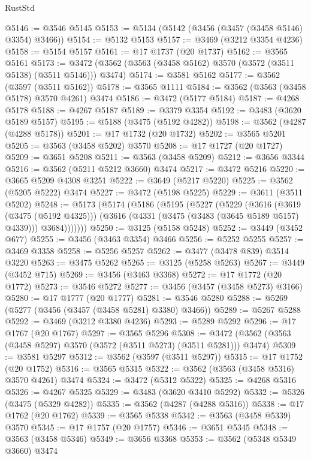 \begin{lexlean}{RustStd}
\begin{coremodule}
@5146 := @3546 @5145
@5153 := @5134 (@5142 (@3456 (@3457 (@3458 @5146) @3354) @3466))
@5154 := @5132 @5153
@5157 := @3469 (@3212 @3354 @4236)
@5158 := @5154 @5157
@5161 := @17 @1737 (@20 @1737)
@5162 := @3565 @5161
@5173 := @3472 (@3562 (@3563 (@3458 @5162) @3570 (@3572 (@3511 @5138) (@3511 @5146))) @3474)
@5174 := @3581 @5162
@5177 := @3562 (@3597 (@3511 @5162))
@5178 := @3565 @1111
@5184 := @3562 (@3563 (@3458 @5178) @3570 @4261) @3474
@5186 := @3472 (@5177 @5184)
@5187 := @4268 @5178
@5188 := @4267 @5187
@5189 := @3379 @3354
@5192 := @3483 (@3620 @5189 @5157)
@5195 := @5188 (@3475 (@5192 @4282))
@5198 := @3562 (@4287 (@4288 @5178))
@5201 := @17 @1732 (@20 @1732)
@5202 := @3565 @5201
@5205 := @3563 (@3458 @5202) @3570
@5208 := @17 @1727 (@20 @1727)
@5209 := @3651 @5208
@5211 := @3563 (@3458 @5209)
@5212 := @3656 @3344
@5216 := @3562 (@5211 @5212 @3660) @3474
@5217 := @3472 @5216
@5220 := @3665 @5209 @4308 @3251
@5222 := @3649 (@5217 @5220)
@5225 := @3562 (@5205 @5222) @3474
@5227 := @3472 (@5198 @5225)
@5229 := @3611 (@3511 @5202)
@5248 := @5173
    (@5174
      (@5186
        (@5195
          (@5227
            (@5229
              (@3616
                (@3619 (@3475 (@5192 @4325)))
                (@3616 (@4331 (@3475 (@3483 (@3645 @5189 @5157) @4339))) @3684)))))))
@5250 := @3125 (@5158 @5248)
@5252 := @3449 (@3452 @677)
@5255 := @3456 (@3463 @3354) @3466
@5256 := @5252 @5255
@5257 := @3469 @3358
@5258 := @5256 @5257
@5262 := @3477 (@3478 @839) @3514 @3220
@5263 := @3475 @5262
@5265 := @3125 (@5258 @5263)
@5267 := @3449 (@3452 @715)
@5269 := @3456 (@3463 @3368)
@5272 := @17 @1772 (@20 @1772)
@5273 := @3546 @5272
@5277 := @3456 (@3457 (@3458 @5273) @3166)
@5280 := @17 @1777 (@20 @1777)
@5281 := @3546 @5280
@5288 := @5269 (@5277 (@3456 (@3457 (@3458 @5281) @3380) @3466))
@5289 := @5267 @5288
@5292 := @3469 (@3212 @3380 @4236)
@5293 := @5289 @5292
@5296 := @17 @1767 (@20 @1767)
@5297 := @3565 @5296
@5308 := @3472 (@3562 (@3563 (@3458 @5297) @3570 (@3572 (@3511 @5273) (@3511 @5281))) @3474)
@5309 := @3581 @5297
@5312 := @3562 (@3597 (@3511 @5297))
@5315 := @17 @1752 (@20 @1752)
@5316 := @3565 @5315
@5322 := @3562 (@3563 (@3458 @5316) @3570 @4261) @3474
@5324 := @3472 (@5312 @5322)
@5325 := @4268 @5316
@5326 := @4267 @5325
@5329 := @3483 (@3620 @3410 @5292)
@5332 := @5326 (@3475 (@5329 @4282))
@5335 := @3562 (@4287 (@4288 @5316))
@5338 := @17 @1762 (@20 @1762)
@5339 := @3565 @5338
@5342 := @3563 (@3458 @5339) @3570
@5345 := @17 @1757 (@20 @1757)
@5346 := @3651 @5345
@5348 := @3563 (@3458 @5346)
@5349 := @3656 @3368
@5353 := @3562 (@5348 @5349 @3660) @3474

\end{coremodule}
\end{lexlean}
